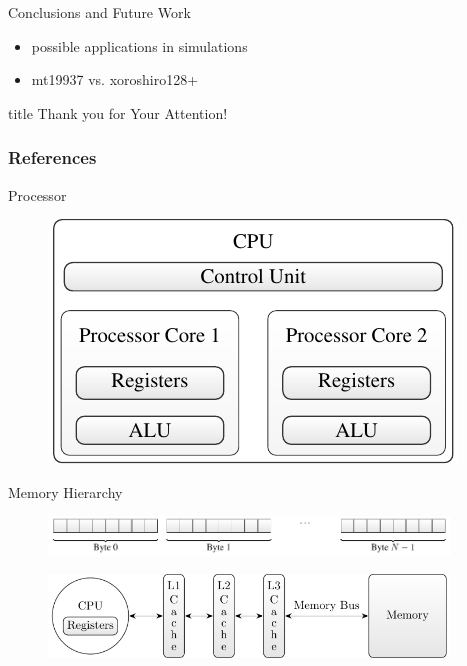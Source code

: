 \documentclass[aspectratio=169]{beamer}
\begin{document}
    \begin{frame}{Conclusions and Future Work}
      \begin{itemize}
        \item possible applications in simulations
        \item mt19937 vs. xoroshiro128+
      \end{itemize}
    \end{frame}

  \begin{frame}
    \vfill
    \centering
    \begin{beamercolorbox}[sep=8pt,center,shadow=true,rounded=true]{title}
      Thank you for Your Attention!%
      \par%
    \end{beamercolorbox}
    \vfill
  \end{frame}

  \begin{frame}
    \frametitle{References}
  \end{frame}

  \appendix

  \begin{frame}{Processor}
    \begin{figure}
      \includegraphics[height=0.5\textheight]{figures/cpu_components.pdf}
    \end{figure}
  \end{frame}

  \begin{frame}{Memory Hierarchy}
    \begin{figure}
      \includegraphics[width=0.95\textwidth]{figures/memory.pdf}
    \end{figure}
    \begin{figure}
      \includegraphics[width=0.95\textwidth]{figures/memory_hierarchy.pdf}
    \end{figure}
  \end{frame}
\end{document}
